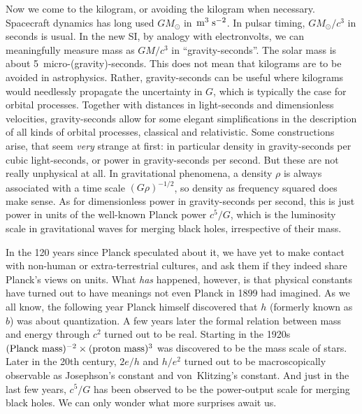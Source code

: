 \documentclass[aps,prb,12pt]{revtex4-1}
\def\unit#1{\;{\rm#1}}
\begin{document}
Now we come to the kilogram, or avoiding the kilogram when necessary.
Spacecraft dynamics has long used $GM_\odot$ in
$\!\unit{m}^3\unit{s}^{-2}$.  In pulsar timing, $GM_\odot/c^3$ in
seconds is usual.  In the new SI, by analogy with electronvolts, we
can meaningfully measure mass as $GM/c^3$ in ``gravity-seconds''.  The
solar mass is about 5~micro-(gravity)-seconds.  This does not mean
that kilograms are to be avoided in astrophysics.  Rather,
gravity-seconds can be useful where kilograms would needlessly
propagate the uncertainty in $G$, which is typically the case for
orbital processes.  Together with distances in light-seconds and
dimensionless velocities, gravity-seconds allow for some elegant
simplifications in the description of all kinds of orbital processes,
classical and relativistic.\cite{2020PASP..132b1001S} Some
constructions arise, that seem {\em very} strange at first: in
particular density in gravity-seconds per cubic light-seconds, or
power in gravity-seconds per second.  But these are not really
unphysical at all.  In gravitational phenomena, a density $\rho$ is
always associated with a time scale $(G\rho)^{-1/2}$, so density as
frequency squared does make sense.  As for dimensionless power in
gravity-seconds per second, this is just power in units of the
well-known Planck power $c^5/G$, which is the luminosity scale in
gravitational waves for merging black holes, irrespective of their
mass.

In the 120 years since Planck speculated about it, we have yet to make
contact with non-human or extra-terrestrial cultures, and ask them if
they indeed share Planck's views on units.  What {\em has} happened,
however, is that physical constants have turned out to have meanings
not even Planck in 1899 had imagined.  As we all know, the following
year Planck himself discovered that $h$ (formerly known as $b$) was
about quantization.  A few years later the formal relation between
mass and energy through $c^2$ turned out to be real.  Starting in the
1920s $(\hbox{Planck mass})^{-2}\times(\hbox{proton mass})^3$ was
discovered to be the mass scale of stars.  Later in the 20th century,
$2e/h$ and $h/e^2$ turned out to be macroscopically observable as
Josephson's constant and von~Klitzing's constant.  And just in the
last few years, $c^5/G$ has been observed to be the power-output scale
for merging black holes.  We can only wonder what more surprises await
us.

\def\aj{AJ}
\def\apjl{ApJL}
\def\aap{A\&A}
\def\mnras{MNRAS}
\def\pasp{PASP}



\end{document}
